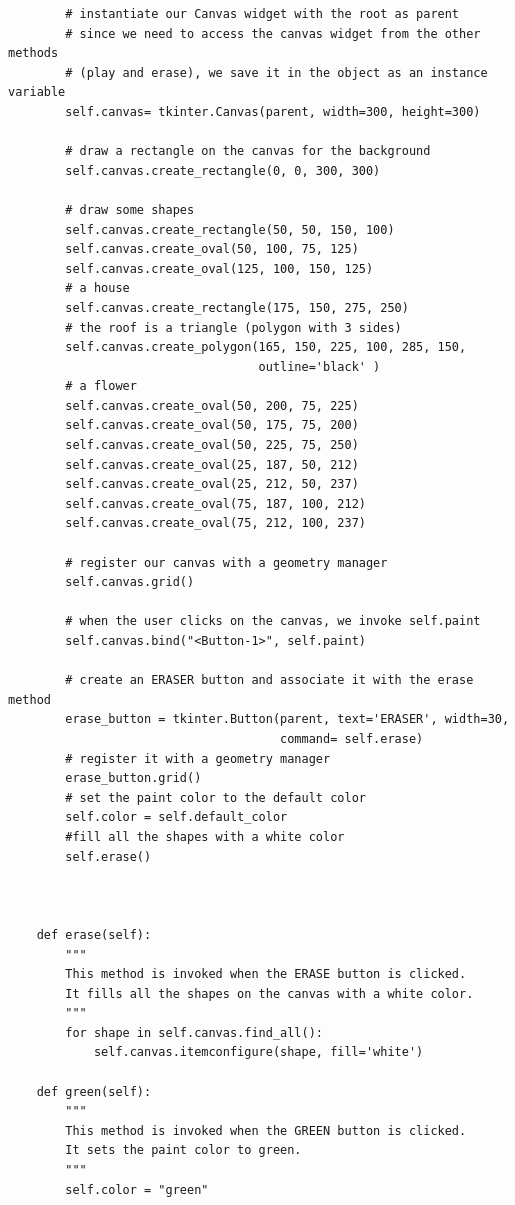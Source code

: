 \documentclass{article}
\begin{document}
\begin{lstlisting}
        # instantiate our Canvas widget with the root as parent
        # since we need to access the canvas widget from the other methods
        # (play and erase), we save it in the object as an instance variable
        self.canvas= tkinter.Canvas(parent, width=300, height=300)

        # draw a rectangle on the canvas for the background
        self.canvas.create_rectangle(0, 0, 300, 300)

        # draw some shapes
        self.canvas.create_rectangle(50, 50, 150, 100)
        self.canvas.create_oval(50, 100, 75, 125)
        self.canvas.create_oval(125, 100, 150, 125)
        # a house
        self.canvas.create_rectangle(175, 150, 275, 250)
        # the roof is a triangle (polygon with 3 sides)
        self.canvas.create_polygon(165, 150, 225, 100, 285, 150,
                                   outline='black' )
        # a flower
        self.canvas.create_oval(50, 200, 75, 225)
        self.canvas.create_oval(50, 175, 75, 200)
        self.canvas.create_oval(50, 225, 75, 250)
        self.canvas.create_oval(25, 187, 50, 212)
        self.canvas.create_oval(25, 212, 50, 237)
        self.canvas.create_oval(75, 187, 100, 212)
        self.canvas.create_oval(75, 212, 100, 237)

        # register our canvas with a geometry manager
        self.canvas.grid()

        # when the user clicks on the canvas, we invoke self.paint
        self.canvas.bind("<Button-1>", self.paint)

        # create an ERASER button and associate it with the erase method
        erase_button = tkinter.Button(parent, text='ERASER', width=30,
                                      command= self.erase)
        # register it with a geometry manager
        erase_button.grid()
        # set the paint color to the default color
        self.color = self.default_color
        #fill all the shapes with a white color
        self.erase()



    def erase(self):
        """
        This method is invoked when the ERASE button is clicked.
        It fills all the shapes on the canvas with a white color.
        """
        for shape in self.canvas.find_all():
            self.canvas.itemconfigure(shape, fill='white')

    def green(self):
        """
        This method is invoked when the GREEN button is clicked.
        It sets the paint color to green.
        """
        self.color = "green"


\end{lstlisting}
\end{document}
